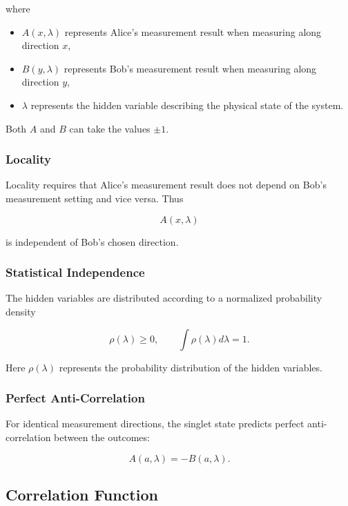 \documentclass[14pt,a4paper]{extarticle}
\begin{document}
where

\begin{itemize}
\item $A(x,\lambda)$ represents Alice's measurement result when measuring along direction $x$,
\item $B(y,\lambda)$ represents Bob's measurement result when measuring along direction $y$,
\item $\lambda$ represents the hidden variable describing the physical state of the system.
\end{itemize}

Both $A$ and $B$ can take the values $\pm1$.

\subsubsection{Locality}

Locality requires that Alice’s measurement result does not depend on Bob’s measurement setting and vice versa. Thus

\[
A(x,\lambda)
\]

is independent of Bob’s chosen direction.

\subsubsection{Statistical Independence}

The hidden variables are distributed according to a normalized probability density

\[
\rho(\lambda) \ge 0,
\qquad
\int \rho(\lambda) d\lambda = 1.
\]

Here $\rho(\lambda)$ represents the probability distribution of the hidden variables.

\subsubsection{Perfect Anti-Correlation}

For identical measurement directions, the singlet state predicts perfect anti-correlation between the outcomes:

\[
A(a,\lambda) = -B(a,\lambda).
\]


\subsection{Correlation Function}
\end{document}
